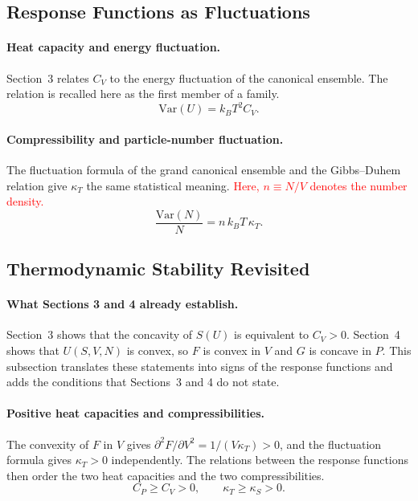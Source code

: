 \subsection{Response Functions as Fluctuations}

\paragraph{Heat capacity and energy fluctuation.}
Section~3 relates $C_V$ to the energy fluctuation of the canonical
ensemble. The relation is recalled here as the first member of a family.
\begin{equation}
    \boxed{\mathrm{Var}(U)=k_BT^2C_V.}
\end{equation}

\paragraph{Compressibility and particle-number fluctuation.}
The fluctuation formula of the grand canonical ensemble and the Gibbs--Duhem
relation give $\kappa_T$ the same statistical meaning.
\textcolor{red}{Here, $n\equiv N/V$ denotes the number density.}
\begin{equation}
    \boxed{\frac{\mathrm{Var}(N)}{N}=n\,k_BT\,\kappa_T.}
\end{equation}

\subsection{Thermodynamic Stability Revisited}

\paragraph{What Sections 3 and 4 already establish.}
Section~3 shows that the concavity of $S(U)$ is equivalent to $C_V>0$.
Section~4 shows that $U(S,V,N)$ is convex, so $F$ is convex in $V$ and $G$
is concave in $P$. This subsection translates these statements into signs
of the response functions and adds the conditions that Sections~3 and 4 do
not state.

\paragraph{Positive heat capacities and compressibilities.}
The convexity of $F$ in $V$ gives $\partial^2F/\partial V^2=1/(V\kappa_T)>0$,
and the fluctuation formula gives $\kappa_T>0$ independently. The relations
between the response functions then order the two heat capacities and the
two compressibilities.
\begin{equation}
    \boxed{C_P\geq C_V>0,\qquad\kappa_T\geq\kappa_S>0.}
\end{equation}

